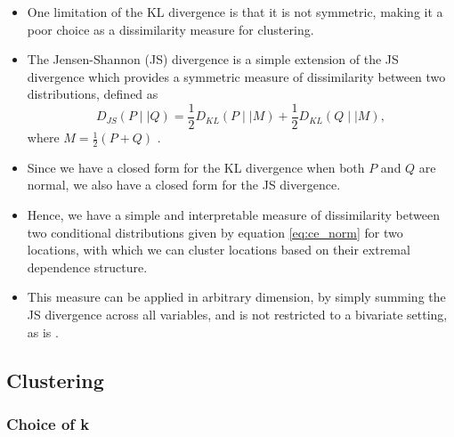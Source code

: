 \documentclass{article}
\numberwithin{equation}{section}
\begin{document}
\vspace{1cm}

\begin{itemize}
  \item One limitation of the KL divergence is that it is not symmetric, making it a poor choice as a dissimilarity measure for clustering. 
  \item The Jensen-Shannon (JS) divergence is a simple extension of the JS divergence which provides a symmetric measure of dissimilarity between two distributions, defined as 
    \begin{equation} \label{eq:js}
      D_{JS}(P \mid\mid Q) = \frac{1}{2} D_{KL}(P \mid\mid M) + \frac{1}{2} D_{KL}(Q \mid\mid M),
    \end{equation}
    where $M = \frac{1}{2}(P + Q)$ \citep{Lin1991}.
  \item Since we have a closed form for the KL divergence when both $P$ and $Q$ are normal, we also have a closed form for the JS divergence.
  \item Hence, we have a simple and interpretable measure of dissimilarity between two conditional distributions given by equation \ref{eq:ce_norm} for two locations, with which we can cluster locations based on their extremal dependence structure.
  \item This measure can be applied in arbitrary dimension, by simply summing the JS divergence across all variables, and is not restricted to a bivariate setting, as is \cite{Vignotto2021}.
\end{itemize}

\subsection{Clustering}


\begin{itemize}
\end{itemize}

\subsubsection{Choice of k}

\end{document}
